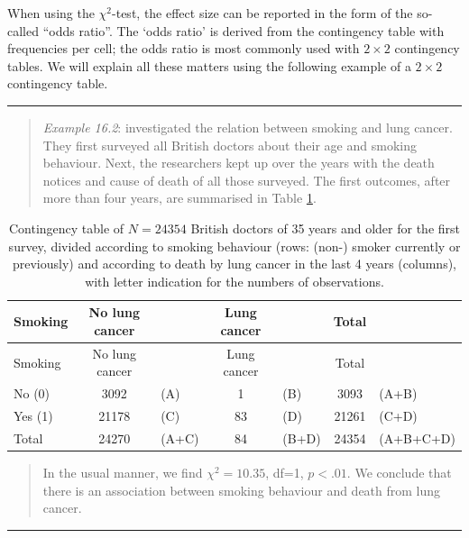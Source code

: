 \documentclass[
]{book}
\begin{document}
When using the \(\chi^2\)-test, the effect size can be reported in the form
of the so-called ``odds ratio''. The `odds ratio' is derived from the contingency
table with frequencies per cell; the odds ratio is most commonly used with \(2 \times 2\) contingency tables.
We will explain all these matters using the following example of a \(2 \times 2\) contingency table.

\begin{center}\rule{0.5\linewidth}{0.5pt}\end{center}

\begin{quote}
\emph{Example 16.2}:
\citet{DollHill1956} investigated the relation between smoking
and lung cancer. They first surveyed all British doctors about
their age and smoking behaviour. Next, the researchers kept up over the years with
the death notices and cause of death of all those surveyed. The first
outcomes, after more than four years, are summarised in
Table \ref{tab:dollhill}.
\end{quote}

\begin{longtable}[]{@{}lclclcl@{}}
\caption{\label{tab:dollhill} Contingency table of \(N=24354\) British doctors of 35 years
and older for the first survey, divided according to smoking behaviour (rows: (non-)
smoker currently or previously) and according to death by lung cancer in the last
4 years (columns), with letter indication for the numbers
of observations.}\tabularnewline
\toprule
Smoking & No lung cancer & & Lung cancer & & Total & \\
\midrule
\endfirsthead
\toprule
Smoking & No lung cancer & & Lung cancer & & Total & \\
\midrule
\endhead
No (0) & 3092 & (A) & 1 & (B) & 3093 & (A+B) \\
Yes (1) & 21178 & (C) & 83 & (D) & 21261 & (C+D) \\
Total & 24270 & (A+C) & 84 & (B+D) & 24354 & (A+B+C+D) \\
\bottomrule
\end{longtable}

\begin{quote}
In the usual manner, we find \(\chi^2=10.35\), df=1, \(p<.01\). We conclude that
there is an association between smoking behaviour and death from lung cancer.
\end{quote}

\begin{center}\rule{0.5\linewidth}{0.5pt}\end{center}
\end{document}
